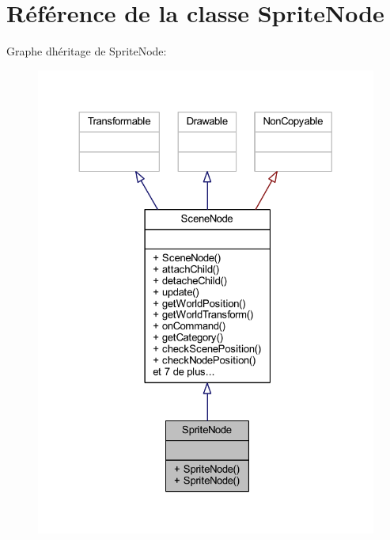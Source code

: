 \hypertarget{class_sprite_node}{}\section{Référence de la classe Sprite\+Node}
\label{class_sprite_node}


Graphe d\textquotesingle{}héritage de Sprite\+Node\+:\nopagebreak
\begin{figure}[H]
\begin{center}
\leavevmode
\includegraphics[width=324pt]{class_sprite_node__inherit__graph}
\end{center}
\end{figure}


